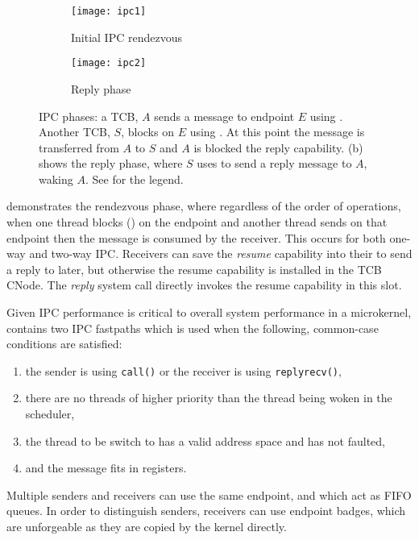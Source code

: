 \begin{figure}
    \centering
    \begin{subfigure}[h]{0.48\textwidth}
        \centering
        \texttt{[image: ipc1]}
        \caption{Initial IPC rendezvous}
        \label{f:ipc1}
    \end{subfigure}%
    \begin{subfigure}[h]{0.48\textwidth}
        \centering
        \texttt{[image: ipc2]}
        \caption{Reply phase}
        \label{f:ipc2}
    \end{subfigure}
    \caption{IPC phases: a TCB, $A$ sends a message to endpoint $E$ using . Another
        TCB, $S$, blocks on $E$ using . At this point the message is transferred from 
        $A$ to $S$ and $A$ is blocked the reply capability. (b) shows the
    reply phase, where $S$ uses  to send a reply message to $A$, waking $A$. See  for the legend.}
    \label{f:ipc}
\end{figure}

 demonstrates the rendezvous phase, where regardless of the order of operations, 
when one thread blocks () on the endpoint and another thread sends on that endpoint
then the message is consumed by the receiver. This occurs for both one-way and two-way \gls{IPC}.
Receivers can save
the \emph{resume} capability into their  to send a reply to later, but otherwise the resume capability is
installed in the \gls{TCB} CNode. The \emph{reply} system call directly invokes the resume
capability in this slot. 

Given \gls{IPC} performance is critical to overall system performance in a microkernel, \selfour
contains two \gls{IPC} fastpaths which is used when the following, common-case conditions are satisfied:

\begin{enumerate}
    \item the sender is using \texttt{call()} or the receiver is using \texttt{replyrecv()},
    \item there are no threads of higher priority than the thread being woken in the scheduler,
    \item the thread to be switch to has a valid address space and has not faulted,
    \item and the message fits in registers.
\end{enumerate}

Multiple senders and receivers can use the same endpoint, and which act as \gls{FIFO}
queues. In order to distinguish senders, receivers can use endpoint badges, which are unforgeable as
they are copied by the kernel directly. 

